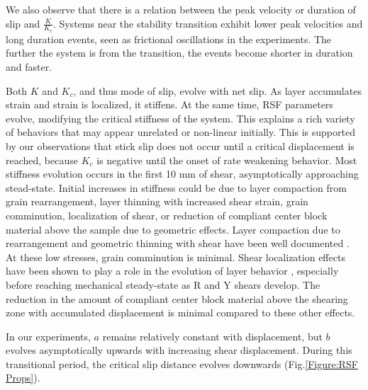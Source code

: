 \documentclass[11pt]{article}
\begin{document}
We also observe that there is a relation between the peak velocity or duration
of slip and $\frac{K}{K_c}$. Systems near the stability transition exhibit
lower peak velocities and long duration events, seen as frictional oscillations
in the experiments. The further the system is from the transition, the events
become shorter in duration and faster.

Both $K$ and $K_c$, and thus mode of slip, evolve with net slip. As layer
accumulates strain and strain is localized, it stiffens. At the same time, RSF
parameters evolve, modifying the critical stiffness of the system. This explains
a rich variety of behaviors that may appear unrelated or non-linear initially.
This is supported by our observations that stick slip does not occur until a
critical displacement is reached, because $K_c$ is negative until the onset of rate
weakening behavior. Most stiffness evolution occurs in the first 10 mm of shear,
asymptotically approaching stead-state. Initial increases in stiffness could be
due to layer compaction from grain rearrangement, layer thinning with increased
shear strain, grain comminution, localization of shear, or reduction of
compliant center block material above the sample due to geometric effects. Layer
compaction due to rearrangement and geometric thinning with shear have been well
documented \cite{Scott:1994}.  At these low stresses, grain comminution is
minimal. Shear localization effects have been shown to play a role in the
evolution of layer behavior \cite{Logan:1992}, especially before reaching
mechanical steady-state as R and Y shears develop. The reduction in the amount
of compliant center block material above the shearing zone with accumulated
displacement is minimal compared to these other effects.

In our experiments, $a$ remains relatively constant with displacement, but $b$
evolves asymptotically upwards with increasing shear displacement. During this
transitional period, the critical slip distance evolves downwards
(Fig.\ref{Figure:RSF Props}).
\end{document}
